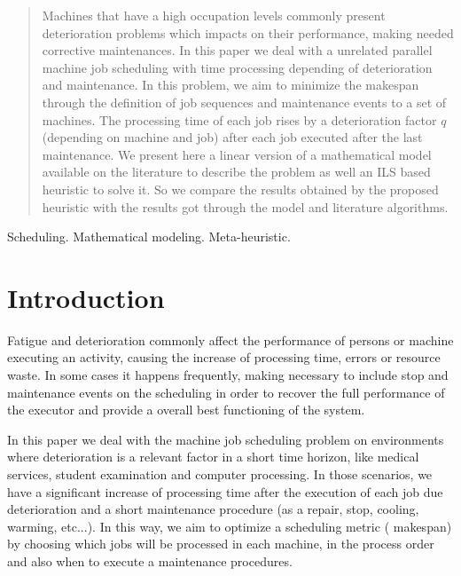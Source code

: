 \documentclass[a4paper,11pt]{article}
\begin{document}
\begin{abstract}
Machines that have a high occupation levels commonly present deterioration problems which impacts on their performance, making needed corrective maintenances. In this paper we deal with a unrelated parallel machine job scheduling with time processing depending of deterioration and maintenance. In this problem, we aim to minimize the makespan through the definition of job sequences and maintenance events to a set of machines. The processing time of each job rises by a deterioration factor $q$ (depending on machine and job) after each job executed after the last maintenance. We present here a linear version of a mathematical model available on the literature to describe the problem as well an ILS based heuristic to solve it. So we compare the results obtained by the proposed heuristic with the results got through the model and literature algorithms. 
\end{abstract}

\bigskip
\begin{keywords}
Scheduling. Mathematical modeling. Meta-heuristic.

\bigskip
{}
\end{keywords}

 
\newpage
\section{Introduction} 
 
 Fatigue and deterioration commonly affect the performance of persons or machine executing an activity, causing the increase of processing time, errors or resource waste. In some cases it happens frequently, making necessary to include stop and maintenance events on the scheduling in order to recover the full performance of the executor and provide a overall best functioning of the system. 
 
 In this paper we deal with the machine job scheduling problem on environments where deterioration is a relevant factor in a short time horizon, like medical services, student examination and computer processing. In those scenarios, we have a significant increase of processing time after the execution of each job due deterioration and a short maintenance procedure (as a repair, stop, cooling, warming, etc...). In this way, we aim to optimize a scheduling metric ( makespan) by choosing which jobs will be processed in each machine, in the process order and also when to execute a maintenance procedures. 
 
\end{document}
